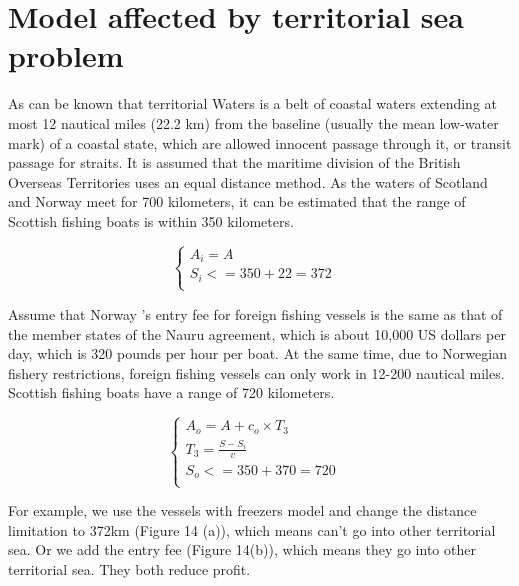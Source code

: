 \documentclass{mcmthesis}
\begin{document}
\section{Model affected by territorial sea problem}
As can be known that territorial Waters is a belt of coastal waters extending at most 12 nautical miles (22.2 km) from the baseline (usually the mean low-water mark) of a coastal state, which are allowed innocent passage through it, or transit passage for straits.
It is assumed that the maritime division of the British Overseas Territories uses an equal distance method. As the waters of Scotland and Norway meet for 700 kilometers, it can be estimated that the range of Scottish fishing boats is within 350 kilometers.

\begin{equation}
\left\{
\begin{array}{lr}
A_i=A &\\
S_i<= 350+22 =372 \\
\end{array}
\right.
\end{equation}



Assume that Norway ’s entry fee for foreign fishing vessels is the same as that of the member states of the Nauru agreement, which is about 10,000 US dollars per day, which is 320 pounds per hour per boat. At the same time, due to Norwegian fishery restrictions, foreign fishing vessels can only work in 12-200 nautical miles. Scottish fishing boats have a range of 720 kilometers.

\begin{equation}
\left\{
\begin{array}{lr}
A_o=A+c_o \times T_3 &\\
T_3=\frac{S-S_i}{v} &\\
S_o<= 350+370=720 \\
\end{array}
\right.
\end{equation}

For example, we use the vessels with freezers model and change the distance limitation to 372km (Figure 14 (a)), which means can't go into other territorial sea. Or we add the entry fee (Figure 14(b)), which means they go into other territorial sea. They both reduce profit.
\end{document}
